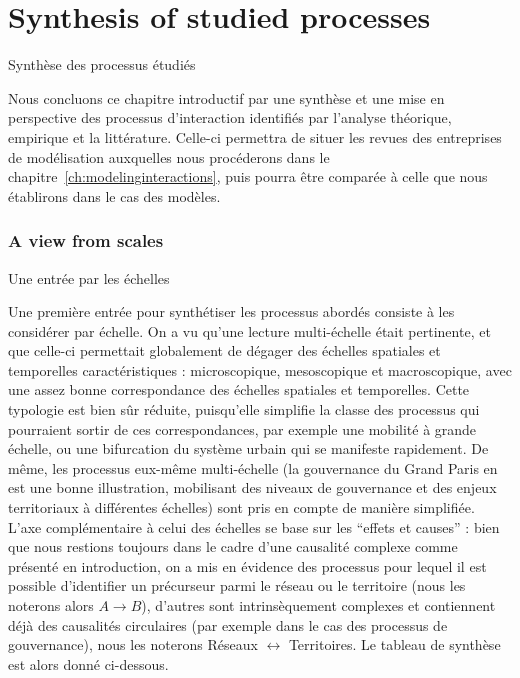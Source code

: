 


\newpage

\section*{Synthesis of studied processes}{Synthèse des processus étudiés}



Nous concluons ce chapitre introductif par une synthèse et une mise en perspective des processus d'interaction identifiés par l'analyse théorique, empirique et la littérature. Celle-ci permettra de situer les revues des entreprises de modélisation auxquelles nous procéderons dans le chapitre~\ref{ch:modelinginteractions}, puis pourra être comparée à celle que nous établirons dans le cas des modèles.


\subsubsection*{A view from scales}{Une entrée par les échelles}

Une première entrée pour synthétiser les processus abordés consiste à les considérer par échelle. On a vu qu'une lecture multi-échelle était pertinente, et que celle-ci permettait globalement de dégager des échelles spatiales et temporelles caractéristiques : microscopique, mesoscopique et macroscopique, avec une assez bonne correspondance des échelles spatiales et temporelles. Cette typologie est bien sûr réduite, puisqu'elle simplifie la classe des processus qui pourraient sortir de ces correspondances, par exemple une mobilité à grande échelle, ou une bifurcation du système urbain qui se manifeste rapidement. De même, les processus eux-même multi-échelle (la gouvernance du Grand Paris en est une bonne illustration, mobilisant des niveaux de gouvernance et des enjeux territoriaux à différentes échelles) sont pris en compte de manière simplifiée. L'axe complémentaire à celui des échelles se base sur les ``effets et causes'' : bien que nous restions toujours dans le cadre d'une causalité complexe comme présenté en introduction, on a mis en évidence des processus pour lequel il est possible d'identifier un précurseur parmi le réseau ou le territoire (nous les noterons alors $A \rightarrow B$), d'autres sont intrinsèquement complexes et contiennent déjà des causalités circulaires (par exemple dans le cas des processus de gouvernance), nous les noterons Réseaux $\leftrightarrow$ Territoires. Le tableau de synthèse est alors donné ci-dessous.


